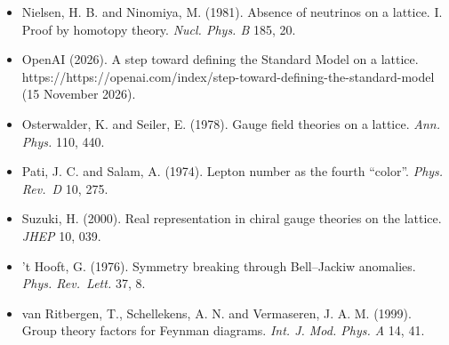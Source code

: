 \documentclass[
]{article}
\begin{document}
\begin{itemize}
\item
  Nielsen, H. B. and Ninomiya, M. (1981). Absence of neutrinos on a
  lattice. I. Proof by homotopy theory. \emph{Nucl. Phys. B} 185, 20.
\item
  OpenAI (2026). A step toward defining the Standard Model on a lattice.
  https://https://openai.com/index/step-toward-defining-the-standard-model (15
  November 2026).
\item
  Osterwalder, K. and Seiler, E. (1978). Gauge field theories on a
  lattice. \emph{Ann. Phys.} 110, 440.
\item
  Pati, J. C. and Salam, A. (1974). Lepton number as the fourth
  ``color''. \emph{Phys. Rev.~D} 10, 275.
\item
  Suzuki, H. (2000). Real representation in chiral gauge theories on the
  lattice. \emph{JHEP} 10, 039.
\item
  't Hooft, G. (1976). Symmetry breaking through Bell--Jackiw anomalies.
  \emph{Phys. Rev.~Lett.} 37, 8.
\item
  van Ritbergen, T., Schellekens, A. N. and Vermaseren, J. A. M. (1999).
  Group theory factors for Feynman diagrams. \emph{Int. J. Mod. Phys. A}
  14, 41.
\end{itemize}
\end{document}
